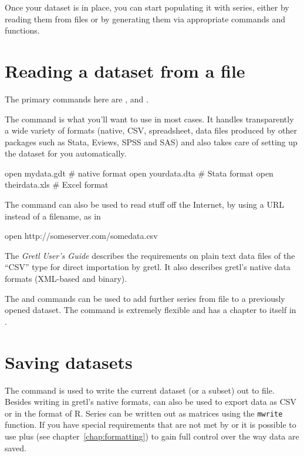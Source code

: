 Once your dataset is in place, you can start populating it with
series, either by reading them from files or by generating them via
appropriate commands and functions.

\section{Reading a dataset from a file}

The primary commands here are ,  and .

The  command is what you'll want to use in most cases. It
handles transparently a wide variety of formats (native, CSV,
spreadsheet, data files produced by other packages such as
\textsf{Stata}, \textsf{Eviews}, \textsf{SPSS} and \textsf{SAS}) and
also takes care of setting up the dataset for you automatically.
\begin{code}
  open mydata.gdt    # native format
  open yourdata.dta  # Stata format
  open theirdata.xls # Excel format
\end{code}

The  command can also be used to read stuff off the
Internet, by using a URL instead of a filename, as in
\begin{code}
  open http://someserver.com/somedata.csv
\end{code}

The \textit{Gretl User's Guide} describes the requirements on plain
text data files of the ``CSV'' type for direct importation by
gretl. It also describes gretl's native data formats (XML-based and
binary).

The  and  commands can be used to add further
series from file to a previously opened dataset. The 
command is extremely flexible and has a chapter to itself in
\GUG.

\section{Saving datasets}

The  command is used to write the current dataset (or a
subset) out to file. Besides writing in gretl's native formats,
 can also be used to export data as CSV or in the format of
\textsf{R}. Series can be written out as matrices using the
\texttt{mwrite} function. If you have special requirements that are
not met by  or  it is possible to use
 plus  (see chapter~\ref{chap:formatting})
to gain full control over the way data are saved.


